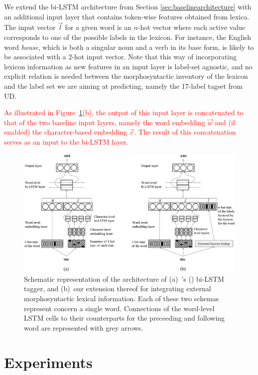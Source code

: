\documentclass[11pt,letterpaper]{article}
\begin{document}
We extend the bi-LSTM architecture from Section \ref{sec:baselinearchitecture} with an additional input layer that
contains token-wise features obtained from lexica. The input vector $\vec{l}$ for a given word is an $n$-hot vector
where each active value corresponds to one of the possible labels in the lexicon. For instance, the English word
\textit{house}, which is both a singular noun and a verb in its base form, is likely to be associated with a 2-hot input
vector.  Note that this way of incorporating lexicon information as new features in an input layer is label-set
agnostic, and no explicit relation is needed between the morphosyntactic inventory of the lexicon and the label set we
are aiming at predicting, namely the 17-label tagset from UD.

\textcolor{red}{As illustrated in Figure~\ref{fig:schema}(b), the output of this input layer is concatenated to that of
  the two baseline input layers, namely the word embedding $\vec{w}$ and (if enabled) the character-based embedding
  $\vec{c}$. The result of this concatenation serves as an input to the bi-LSTM layer.}

\begin{figure}
\includegraphics[width=\linewidth]{emnlp17schema}
\caption{Schematic representation of the architecture of (a)~\citeauthor{plank16}'s (\citeyear{plank16}) bi-LSTM tagger,
and (b)~our extension thereof for integrating external morphosyntactic lexical information. Each of these two schemas
represent concern a single word. Connections of the word-level LSTM cells to their counterparts for the preceeding and
following word are represented with grey arrows.}\label{fig:schema}
\end{figure}

\section{Experiments}
\end{document}
